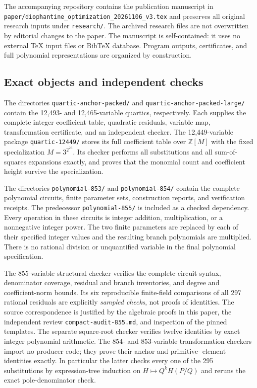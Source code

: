 \documentclass[11pt]{article}
\theoremstyle{definition}
\newcommand{\Z}{\mathbb Z}
\begin{document}
The accompanying repository contains the publication manuscript in
\nolinkurl{paper/diophantine_optimization_20261106_v3.tex} and preserves
all original research inputs under \nolinkurl{research/}. The archived
research files are not overwritten by editorial changes to the paper.
The manuscript is self-contained: it uses no external TeX input files or
BibTeX database. Program outputs, certificates, and full polynomial
representations are organized by construction.

\subsection{Exact objects and independent checks}

The directories \nolinkurl{quartic-anchor-packed/} and
\nolinkurl{quartic-anchor-packed-large/} contain the 12,493- and
12,465-variable quartics, respectively. Each supplies the complete
integer coefficient table, quadratic residuals, variable map,
transformation certificate, and an independent checker. The
12,449-variable package \nolinkurl{quartic-12449/} stores its full
coefficient table over $\Z[M]$ with the fixed specialization
$M=3^{2^{26}}$. Its checker performs all substitutions and all
sum-of-squares expansions exactly, and proves that the monomial count
and coefficient height survive the specialization.

The directories \nolinkurl{polynomial-853/} and
\nolinkurl{polynomial-854/} contain the complete polynomial circuits,
finite parameter sets, construction reports, and verification receipts.
The predecessor \nolinkurl{polynomial-855/} is included as a checked
dependency. Every operation in these circuits is integer addition,
multiplication, or a nonnegative integer power. The two finite parameters
are replaced by each of their specified integer values and the resulting
branch polynomials are multiplied. There is no rational division or
unquantified variable in the final polynomial specification.

The 855-variable structural checker verifies the complete circuit
syntax, denominator coverage, residual and branch inventories, and
degree and coefficient-norm bounds. Its six reproducible finite-field
comparisons of all 297 rational residuals are explicitly \emph{sampled
checks}, not proofs of identities. The source correspondence is justified
by the algebraic proofs in this paper, the independent review
\nolinkurl{compact-audit-855.md}, and inspection of the pinned templates.
The separate square-root checker verifies twelve identities by exact
integer polynomial arithmetic. The 854- and 853-variable transformation
checkers import no producer code; they prove their anchor and primitive-
element identities exactly. In particular the latter checks every one
of the 295 substitutions by expression-tree induction on
$H\mapsto Q^kH(P/Q)$ and reruns the exact pole-denominator check.
\end{document}
